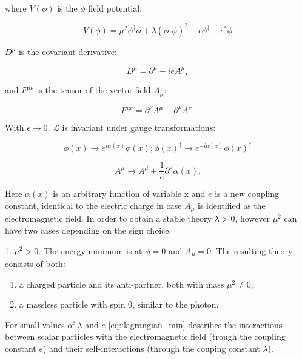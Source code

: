 where $V(\phi)$ is the $\phi$ field potential:

\begin{equation}
V(\phi)=\mu^{2}\phi^{\dagger}\phi+\lambda(\phi^{\dagger}\phi)^{2} -\epsilon\phi^{\dagger} -\epsilon^{*}\phi
\end{equation}

$D^{\mu}$ is the covariant derivative:

\begin{equation}
D^{\mu} = \partial^{\mu} - ieA^{\mu},
\end{equation}

and $F^{\mu\nu}$ is the tensor of the vector field $A_{\mu}$:

\begin{equation}
F^{\mu\nu} =\partial^{\nu}A^{\mu} - \partial^{\mu}A^{\nu}.
\end{equation}

With $\epsilon \rightarrow 0$, $\mathcal{L}$ is invariant under gauge transformations:

\begin{equation}
\phi(x) \rightarrow e^{i\alpha(x)}\phi(x); \phi(x)^{\dagger} \rightarrow e ^{-i\alpha(x)}\phi(x)^{\dagger}
\end{equation}

\begin{equation}
A^{\mu} \rightarrow A^{\mu} + \dfrac{1}{e}\partial^{\mu}\alpha(x).
\label{eq::a_tranform}
\end{equation}

Here $\alpha(x)$ is an arbitrary function of variable x and $e$ is a new coupling constant, identical to the electric charge in case $A_{\mu}$ is identified as the electromagnetic field. In order to obtain a stable theory $\lambda > 0$, however $\mu^{2}$ can have two cases depending on the sign choice:
 
1. $\mu^{2} > 0$. The energy minimum is at $\phi = 0$ and $A_{\mu} = 0$. The resulting theory consists of both:

\begin{enumerate}
	\item a charged particle and its anti-partner, both with mass $\mu^{2} \neq 0$;
	\item a massless particle with spin 0, similar to the photon.
\end{enumerate}

For small values of $\lambda$ and $e$ \autoref{eq::lagrangian_min} describes the interactions between scalar particles with the electromagnetic field (trough the coupling constant $e$) and their self-interactions (through the couping constant $\lambda$).

